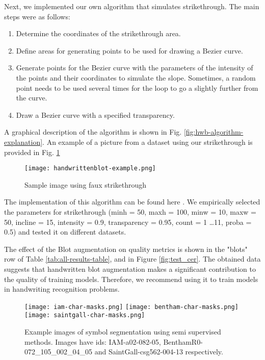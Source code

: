 \documentclass[10pt,twocolumn,letterpaper]{article}
\begin{document}
Next, we implemented our own algorithm that simulates strikethrough. The main steps were as follows:
\begin{enumerate}
    \item Determine the coordinates of the strikethrough area.
    \item Define areas for generating points to be used for drawing a Bezier curve.
    \item Generate points for the Bezier curve with the parameters of the intensity of the points and their coordinates to simulate the slope. Sometimes, a random point needs to be used several times for the loop to go a slightly further from the curve.
    \item Draw a Bezier curve with a specified transparency.
\end{enumerate}

A graphical description of the algorithm is shown in Fig. \ref{fig:hwb-algorithm-explanation}. An example of a picture from a dataset using our strikethrough is provided in Fig. \ref{fig:hwb-hwb-example}

\begin{figure}[t]
\begin{center}
   \texttt{[image: handwrittenblot-example.png]}
\end{center}
   \caption{Sample image using faux strikethrough}
\label{fig:hwb-hwb-example}
\end{figure}

The implementation of this algorithm can be found here \cite{codelink}. We empirically selected the parameters for strikethrough (minh = 50, maxh = 100, minw = 10, maxw = 50, incline = 15, intensity = 0.9, transparency = 0.95, count = 1 \ldots 11, proba = 0.5) and tested it on different datasets.



The effect of the Blot augmentation on quality metrics is shown in the "blots" row of Table \ref{tab:all-results-table}, and in Figure \ref{fig:test_cer}. The obtained data suggests that handwritten blot augmentation makes a significant contribution to the quality of training models. Therefore, we recommend using it to train models in handwriting recognition problems.

\begin{figure*}
\begin{center}
\texttt{[image: iam-char-masks.png]}
    \label{fig:example1}
    \texttt{[image: bentham-char-masks.png]}
    \label{fig:example2}
    \texttt{[image: saintgall-char-masks.png]}
    \label{fig:example3}
\end{center}
   \caption{Example images of symbol segmentation using semi supervised methods. Images have ids: IAM-a02-082-05, BenthamR0-072\_105\_002\_04\_05 and SaintGall-csg562-004-13 respectively.}
\label{fig:char-masks-examples}
\end{figure*}
\end{document}
